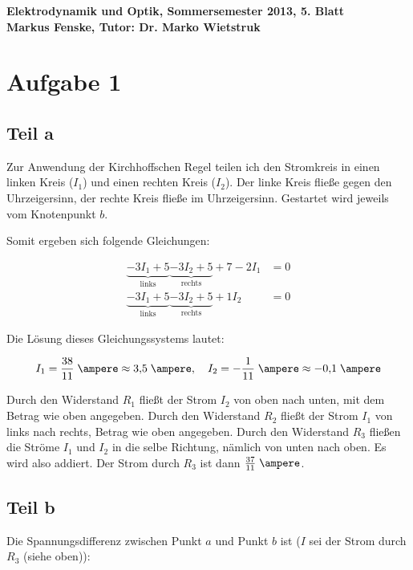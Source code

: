 \documentclass[a4paper,german,12pt,smallheadings]{scrartcl}
\begin{document}
\begin{center}
\bfseries %
\sffamily %
\vspace{-40pt}
Elektrodynamik und Optik, Sommersemester 2013, 5. Blatt \\
Markus Fenske, Tutor: Dr. Marko Wietstruk
\vspace{-10pt}
\end{center}
\section*{Aufgabe 1}
\subsection*{Teil a}

Zur Anwendung der Kirchhoffschen Regel teilen ich den Stromkreis in einen
linken Kreis ($I_1$) und einen rechten Kreis ($I_2$). Der linke Kreis fließe
gegen den Uhrzeigersinn, der rechte Kreis fließe im Uhrzeigersinn.  Gestartet
wird jeweils vom Knotenpunkt $b$.

Somit ergeben sich folgende Gleichungen:

\begin{align*}
  \underbrace{-3I_1+5}_{\text{links}}\underbrace{-3I_2+5}_{\text{rechts}}+7-2I_1 &= 0 \\
  \underbrace{-3I_1+5}_{\text{links}}\underbrace{-3I_2+5}_{\text{rechts}}+1I_2 &= 0
\end{align*}

Die Lösung dieses Gleichungssystems lautet:

\begin{align*}
  I_1 = \frac{38}{11}\;\ampere\approx3{,}5\;\ampere,\quad I_2 = -\frac{1}{11}\;\ampere\approx-0{,}1\;\ampere
\end{align*}

Durch den Widerstand $R_1$ fließt der Strom $I_2$ von oben nach unten, mit dem
Betrag wie oben angegeben. Durch den Widerstand $R_2$ fließt der Strom $I_1$
von links nach rechts, Betrag wie oben angegeben. Durch den Widerstand $R_3$
fließen die Ströme $I_1$ und $I_2$ in die selbe Richtung, nämlich von unten
nach oben. Es wird also addiert. Der Strom durch $R_3$ ist dann
$\frac{37}{11}\;\ampere$.

\subsection*{Teil b}

Die Spannungsdifferenz zwischen Punkt $a$ und Punkt $b$ ist ($I$ sei der Strom
durch $R_3$ (siehe oben)):
\end{document}
